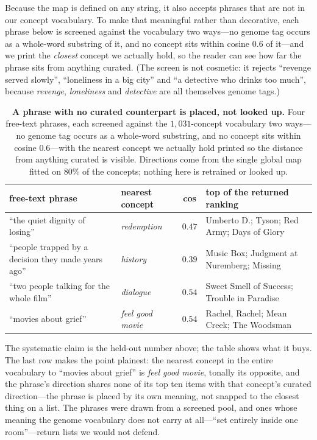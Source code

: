 \documentclass[11pt]{article}
\begin{document}
Because the map is defined on any string, it also accepts phrases that are not in our concept vocabulary.
To make that meaningful rather than decorative, each phrase below is screened against the vocabulary two
ways---no genome tag occurs as a whole-word substring of it, and no concept sits within cosine $0.6$ of
it---and we print the \emph{closest} concept we actually hold, so the reader can see how far the phrase
sits from anything curated. (The screen is not cosmetic: it rejects ``revenge served slowly'',
``loneliness in a big city'' and ``a detective who drinks too much'', because \emph{revenge},
\emph{loneliness} and \emph{detective} are all themselves genome tags.)

\begin{table}[t]\centering\small
\setlength{\tabcolsep}{5pt}
\begin{tabular}{p{4.4cm}p{2.1cm}c p{5.6cm}}
\toprule
free-text phrase & nearest concept & cos & top of the returned ranking \\
\midrule
``the quiet dignity of losing'' & \emph{redemption} & $0.47$ & Umberto D.; Tyson; Red Army; Days of Glory \\
``people trapped by a decision they made years ago'' & \emph{history} & $0.39$ & Music Box; Judgment at Nuremberg; Missing \\
``two people talking for the whole film'' & \emph{dialogue} & $0.54$ & Sweet Smell of Success; Trouble in Paradise \\
``movies about grief'' & \emph{feel good movie} & $0.54$ & Rachel, Rachel; Mean Creek; The Woodsman \\
\bottomrule
\end{tabular}
\caption{\textbf{A phrase with no curated counterpart is placed, not looked up.} Four free-text phrases,
each screened against the $1{,}031$-concept vocabulary two ways---no genome tag occurs as a whole-word
substring, and no concept sits within cosine $0.6$---with the nearest concept we actually hold printed so
the distance from anything curated is visible. Directions come from the single global map fitted on $80\%$
of the concepts; nothing here is retrained or looked up.}
\label{tab:freetext}
\end{table}

\noindent The systematic claim is the held-out number above; the table shows what it buys. The last row
makes the point plainest: the nearest concept in the entire vocabulary to ``movies about grief'' is
\emph{feel good movie}, tonally its opposite, and the phrase's direction shares none of its top ten items
with that concept's curated direction---the phrase is placed by its own meaning, not snapped to the
closest thing on a list. The phrases were drawn from a screened pool, and ones whose meaning the genome
vocabulary does not carry at all---``set entirely inside one room''---return lists we would not defend.
\end{document}
